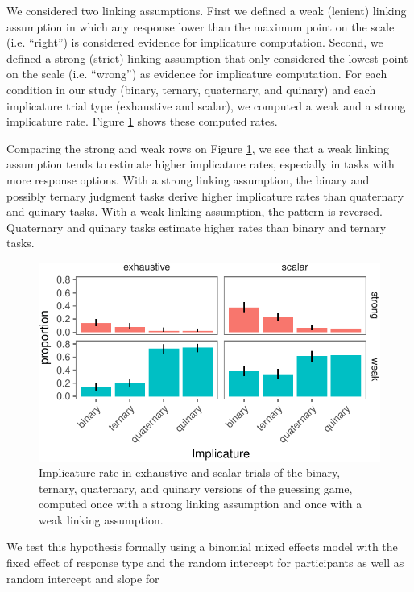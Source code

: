 \documentclass[floatsintext,man]{apa6}
\theoremstyle{definition}
\theoremstyle{definition}
\theoremstyle{definition}
\theoremstyle{remark}
\begin{document}
We considered two linking assumptions. First we defined a weak (lenient)
linking assumption in which any response lower than the maximum point on
the scale (i.e. \enquote{right}) is considered evidence for implicature
computation. Second, we defined a strong (strict) linking assumption
that only considered the lowest point on the scale (i.e.
\enquote{wrong}) as evidence for implicature computation. For each
condition in our study (binary, ternary, quaternary, and quinary) and
each implicature trial type (exhaustive and scalar), we computed a weak
and a strong implicature rate. Figure \ref{fig:implicatureRatePlot}
shows these computed rates.

Comparing the strong and weak rows on Figure
\ref{fig:implicatureRatePlot}, we see that a weak linking assumption
tends to estimate higher implicature rates, especially in tasks with
more response options. With a strong linking assumption, the binary and
possibly ternary judgment tasks derive higher implicature rates than
quaternary and quinary tasks. With a weak linking assumption, the
pattern is reversed. Quaternary and quinary tasks estimate higher rates
than binary and ternary tasks.

\begin{figure}
\centering
\includegraphics{writeup_files/figure-latex/implicatureRatePlot-1.pdf}
\caption{\label{fig:implicatureRatePlot}Implicature rate in exhaustive and
scalar trials of the binary, ternary, quaternary, and quinary versions
of the guessing game, computed once with a strong linking assumption and
once with a weak linking assumption.}
\end{figure}

We test this hypothesis formally using a binomial mixed effects model
with the fixed effect of response type and the random intercept for
participants as well as random intercept and slope for
\end{document}
